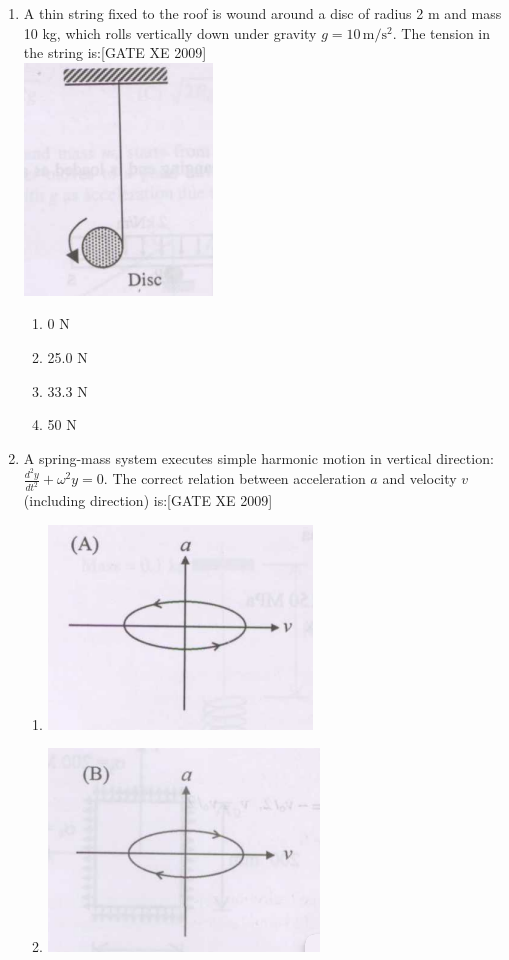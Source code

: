 \documentclass[journal,12pt,onecolumn]{IEEEtran}
\theoremstyle{remark}
\begin{document}
\begin{enumerate}
\item A thin string fixed to the roof is wound around a disc of radius 2 m and mass 10 kg, which rolls vertically down under gravity $g=10\,\mathrm{m/s^2}$. The tension in the string is:\hfill[GATE XE 2009]\\


    \includegraphics[width=0.5\columnwidth]{figs/fig19.png}
    

\begin{multicols}{2}
\begin{enumerate}
    \item 0 N
    \item 25.0 N
    \item 33.3 N
    \item 50 N
\end{enumerate}
\end{multicols}




\item A spring-mass system executes simple harmonic motion in vertical direction: $\frac{d^2 y}{dt^2} + \omega^2 y = 0$. The correct relation between acceleration $a$ and velocity $v$ (including direction) is:\hfill[GATE XE 2009]\\
\begin{multicols}{2}
\begin{enumerate} 
\item \includegraphics[width=0.4\columnwidth]{figs/fig20.png} \item \includegraphics[width=0.4\columnwidth]{figs/fig21.png}
      

\end{enumerate}
\end{multicols}
\end{enumerate}
\end{document}
